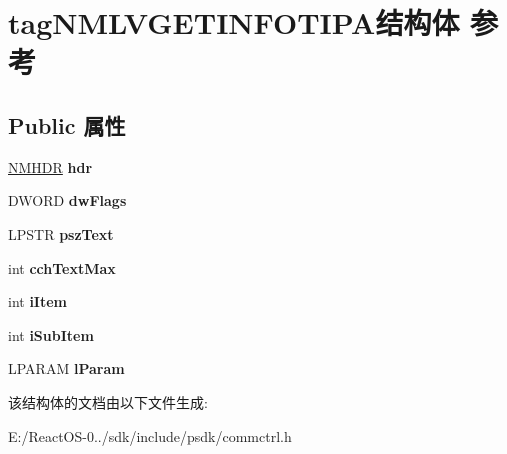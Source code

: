 \hypertarget{structtag_n_m_l_v_g_e_t_i_n_f_o_t_i_p_a}{}\section{tag\+N\+M\+L\+V\+G\+E\+T\+I\+N\+F\+O\+T\+I\+P\+A结构体 参考}
\label{structtag_n_m_l_v_g_e_t_i_n_f_o_t_i_p_a}
\subsection*{Public 属性}
\begin{DoxyCompactItemize}
\item 
\mbox{\label{structtag_n_m_l_v_g_e_t_i_n_f_o_t_i_p_a_a72d81f7b4d2df01d382136b67d0e4840}} 
\hyperlink{structtag_n_m_h_d_r}{N\+M\+H\+DR} {\bfseries hdr}
\item 
\mbox{\label{structtag_n_m_l_v_g_e_t_i_n_f_o_t_i_p_a_adc9a8cee9146b7e9b5798d5f3cece4f7}} 
D\+W\+O\+RD {\bfseries dw\+Flags}
\item 
\mbox{\label{structtag_n_m_l_v_g_e_t_i_n_f_o_t_i_p_a_a4d4169c02485cfefa299a2c3fc85bebf}} 
L\+P\+S\+TR {\bfseries psz\+Text}
\item 
\mbox{\label{structtag_n_m_l_v_g_e_t_i_n_f_o_t_i_p_a_abce7d5cdda67e76a9134ec93cb7b87ed}} 
int {\bfseries cch\+Text\+Max}
\item 
\mbox{\label{structtag_n_m_l_v_g_e_t_i_n_f_o_t_i_p_a_ab0d9b1fac892bad8ade7c4bd01372dae}} 
int {\bfseries i\+Item}
\item 
\mbox{\label{structtag_n_m_l_v_g_e_t_i_n_f_o_t_i_p_a_a866cda9bd445ce8cb4a865e8c519139a}} 
int {\bfseries i\+Sub\+Item}
\item 
\mbox{\label{structtag_n_m_l_v_g_e_t_i_n_f_o_t_i_p_a_a46749fcbca7f8babbd3312678270bbe2}} 
L\+P\+A\+R\+AM {\bfseries l\+Param}
\end{DoxyCompactItemize}


该结构体的文档由以下文件生成\+:\begin{DoxyCompactItemize}
\item 
E\+:/\+React\+O\+S-\/0../sdk/include/psdk/commctrl.\+h\end{DoxyCompactItemize}
